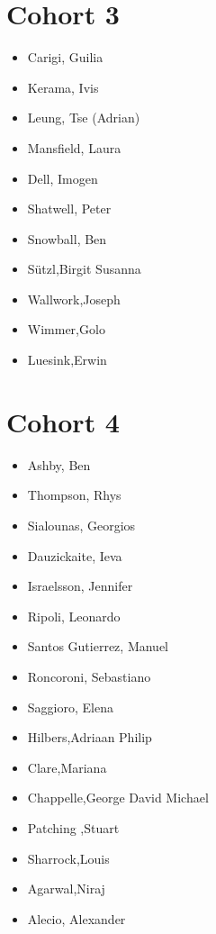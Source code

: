 \documentclass{article}
\begin{document}
\section*{Cohort 3}
\begin{itemize}
    \item Carigi, Guilia 
    \item Kerama, Ivis
    \item Leung, Tse (Adrian) \cite{leung2020impact, leung2019atmospheric}
    \item Mansfield, Laura \cite{mansfield2020predicting}
    \item Dell, Imogen
    \item Shatwell, Peter \cite{shatwell2020ocean}
    \item Snowball, Ben \cite{snowball2020sparse}
    \item Sützl,Birgit Susanna \cite{sutzl2020drag}
    \item Wallwork,Joseph \cite{wallwork2020goal}
    \item Wimmer,Golo \cite{wimmer2020energy}
    \item Luesink,Erwin \cite{geurts2019lyapunov, de2020implications}
\end{itemize}

\section*{Cohort 4}
\begin{itemize}
    \item Ashby, Ben 
    \item Thompson, Rhys \cite{thompson2020accounting, thompsonpro, bloch2021constraining}
    \item Sialounas, Georgios
    \item Dauzickaite, Ieva \cite{dauvzickaite2020spectral}
    \item Israelsson, Jennifer \cite{israelsson2020spatial}
    \item Ripoli, Leonardo
    \item Santos Gutierrez, Manuel \cite{gutierrez2020response}
    \item Roncoroni, Sebastiano
    \item Saggioro, Elena \cite{saggioro2019quantifying, saggioro2020reconstructing}
    \item Hilbers,Adriaan Philip \cite{hilbers2019importance, bloomfield2021importance, hilbers2020efficient}
    \item Clare,Mariana \cite{clare2021hydro, clare2021assessing}
    \item Chappelle,George David Michael
    \item Patching ,Stuart
    \item Sharrock,Louis
    \item Agarwal,Niraj \cite{ryzhov2020data, ryzhov2019data}
    \item Alecio, Alexander 
\end{itemize}
\end{document}

